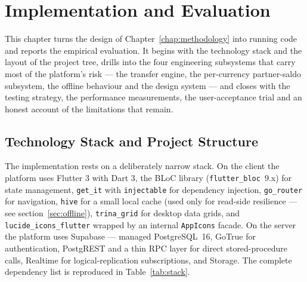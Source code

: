 \chapter{Implementation and Evaluation}
\label{chap:implementation}

This chapter turns the design of Chapter~\ref{chap:methodology} into running code and reports the empirical evaluation. It begins with the technology stack and the layout of the project tree, drills into the four engineering subsystems that carry most of the platform's risk --- the transfer engine, the per-currency partner-saldo subsystem, the offline behaviour and the design system --- and closes with the testing strategy, the performance measurements, the user-acceptance trial and an honest account of the limitations that remain.

\section{Technology Stack and Project Structure}
\label{sec:stack}

The implementation rests on a deliberately narrow stack. On the client the platform uses Flutter 3 with Dart 3, the BLoC library (\texttt{flutter\_bloc}~9.x) for state management, \texttt{get\_it} with \texttt{injectable} for dependency injection, \texttt{go\_router} for navigation, \texttt{hive} for a small local cache (used only for read-side resilience --- see section~\ref{sec:offline}), \texttt{trina\_grid} for desktop data grids, and \texttt{lucide\_icons\_flutter} wrapped by an internal \texttt{AppIcons} facade. On the server the platform uses Supabase --- managed PostgreSQL~16, GoTrue for authentication, PostgREST and a thin RPC layer for direct stored-procedure calls, Realtime for logical-replication subscriptions, and Storage. The complete dependency list is reproduced in Table~\ref{tab:stack}.

